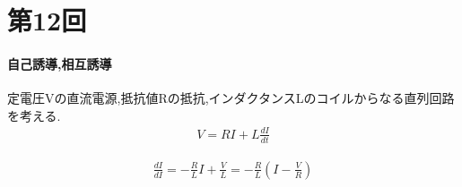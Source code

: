 \documentclass[../main]{subfiles}
\begin{document}
\clearpage

\setcounter{eqnarray}{0}
\setcounter{equation}{0}
\setcounter{figure}{0}

\part*{第12回}

\subsection{自己誘導,相互誘導}
定電圧Vの直流電源,抵抗値Rの抵抗,インダクタンスLのコイルからなる直列回路を考える.
\begin{eqnarray}
V=RI+L\frac{dI}{dt}
\end{eqnarray}

\begin{eqnarray*}
\frac{dI}{dI} = - \frac{R}{L}I + \frac{V}{L} = -\frac{R}{L} \left( I - \frac{V}{R} \right)
\end{eqnarray*}
\end{document}
